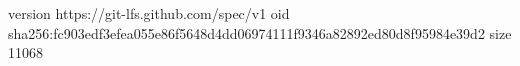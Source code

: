 version https://git-lfs.github.com/spec/v1
oid sha256:fc903edf3efea055e86f5648d4dd06974111f9346a82892ed80d8f95984e39d2
size 11068
